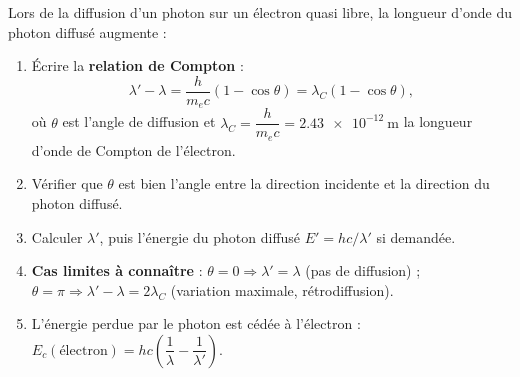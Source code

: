 \documentclass[11pt]{article}
\begin{document}
\begin{methode}
Lors de la diffusion d'un photon sur un électron quasi libre, la longueur d'onde du photon diffusé augmente :
\begin{enumerate}
\item Écrire la \textbf{relation de Compton} :
\[ \lambda' - \lambda = \frac{h}{m_e c}(1 - \cos\theta) = \lambda_C (1 - \cos\theta), \]
où $\theta$ est l'angle de diffusion et $\lambda_C = \dfrac{h}{m_e c} = \num{2,43e-12}\ \text{m}$ la longueur d'onde de Compton de l'électron.
\item Vérifier que $\theta$ est bien l'angle entre la direction incidente et la direction du photon diffusé.
\item Calculer $\lambda'$, puis l'énergie du photon diffusé $E' = hc/\lambda'$ si demandée.
\item \textbf{Cas limites à connaître} : $\theta = 0 \Rightarrow \lambda' = \lambda$ (pas de diffusion) ; $\theta = \pi \Rightarrow \lambda' - \lambda = 2\lambda_C$ (variation maximale, rétrodiffusion).
\item L'énergie perdue par le photon est cédée à l'électron : $E_c(\text{électron}) = hc\left(\dfrac{1}{\lambda} - \dfrac{1}{\lambda'}\right)$.
\end{enumerate}
\end{methode}
\end{document}
